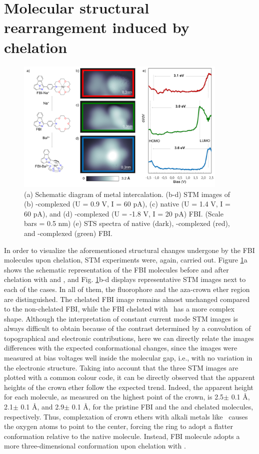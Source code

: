 \documentclass[aps,prl,reprint,longbibliography,superscriptaddress, english]{revtex4-1}
\begin{document}
\section{Molecular structural rearrangement induced by chelation}

\begin{figure}[ht!]
	\includegraphics[width=0.9\textwidth]{figures/Figure_4.png}
	\caption{\label{Fig_STS} 
    (a) Schematic diagram of metal intercalation. (b-d) STM images of (b) \Nap-complexed (U = 0.9 V, I = 60 pA), (c) native (U = 1.4 V, I = 60 pA), and (d) \Bapp-complexed (U = -1.8 V, I = 20 pA) FBI. (Scale bars = 0.5 nm) (e) STS spectra of native (dark), \Nap-complexed (red), and \Bapp-complexed (green) FBI.}
\end{figure}

In order to visualize the aforementioned structural changes undergone by the FBI molecules upon chelation, 
 STM experiments were, again, carried out. Figure \ref{Fig_STS}a shows the schematic representation of the FBI molecules before and after chelation with \Nap and \Bapp, and Fig. \ref{Fig_STS}b-d displays representative STM images next to each of the cases. In all of them, the fluorophore and the aza-crown ether region are distinguished. The \Nap chelated FBI image remains almost unchanged compared to the non-chelated FBI, while the FBI chelated with \Bapp\ has a more complex shape. Although the interpretation of constant current mode STM images is always difficult to obtain because of the contrast determined by a convolution of topographical and electronic contributions, here we can directly relate the images differences with the expected conformational changes, since the images were measured at bias voltages well inside the molecular gap, i.e., with no variation in the electronic structure. Taking into account that the three STM images are plotted with a common colour code, it can be directly observed that the apparent heights of the crown ether follow the expected trend. Indeed, the apparent height for each molecule, as measured on the highest point of the crown, is 2.5$\pm$ 0.1 \AA, 2.1$\pm$ 0.1 \AA, and 2.9$\pm$ 0.1 \AA, for the pristine FBI and the \Nap and \Bapp chelated molecules, respectively. Thus, complexation of crown ethers with alkali metals like \Nap\ causes the oxygen atoms to point to the center, forcing the ring to adopt a flatter conformation relative to the native molecule. Instead, FBI molecule adopts a more three-dimensional conformation upon chelation with \Bapp.  
 
\end{document}
